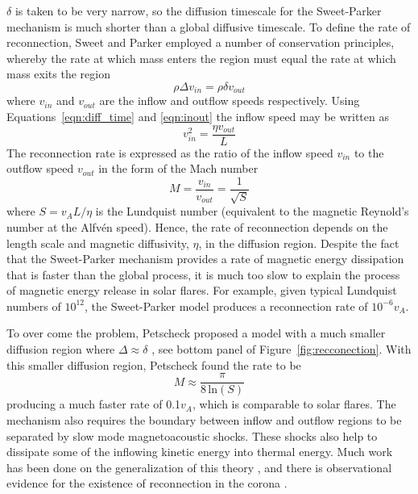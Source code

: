 $\delta$ is taken to be very narrow, so the diffusion timescale for the Sweet-Parker mechanism is much shorter than a global diffusive timescale. To define the rate of reconnection, Sweet and Parker employed a number of conservation principles, whereby the rate at which mass enters the region must equal the rate at which mass exits the region
\begin{equation}
\rho \Delta v_{in} = \rho \delta v_{out}
\label{eqn:inout}
\end{equation}
where $v_{in}$ and $v_{out}$ are the inflow and outflow speeds respectively. Using Equations~\ref{eqn:diff_time} and \ref{eqn:inout} the inflow speed may be written as
\begin{equation}
v_{in}^2 = \frac{\eta v_{out}}{L}
\end{equation}
The reconnection rate is expressed as the ratio of the inflow speed $v_{in}$ to the outflow speed $v_{out}$ in the form of the Mach number
\begin{equation}
M = \frac{v_{in}}{v_{out}} = \frac{1}{\sqrt{S}}
\end{equation}
where $S=v_AL/\eta$ is the Lundquist number (equivalent to the magnetic Reynold's number at the Alfv\'{e}n speed). Hence, the rate of reconnection depends on the length scale and magnetic diffusivity, $\eta$, in the diffusion region. Despite the fact that the Sweet-Parker mechanism provides a rate of magnetic energy dissipation that is faster than the global process, it is much too slow to explain the process of magnetic energy release in solar flares. For example, given typical Lundquist numbers of $10^{12}$, the Sweet-Parker model produces a reconnection rate of $10^{-6}v_A$.

To over come the problem, Petscheck proposed a model with a much smaller diffusion region where $\Delta\approx\delta$ \citep{petschek1964}, see bottom panel of Figure~\ref{fig:recconection}. With this smaller diffusion region, Petscheck found the rate to be \begin{equation}
M \approx \frac{\pi}{8\,\mathrm{ln}(S)}
\end{equation}
producing a much faster rate of 0.1$v_A$, which is comparable to solar flares. The mechanism also requires the boundary between inflow and outflow regions to be separated by slow mode magnetoacoustic shocks. These shocks also help to dissipate some of the inflowing kinetic energy into thermal energy. Much work has been done on the generalization of this theory \citep{priest1986, sonnerup1970}, and there is observational evidence for the existence of reconnection in the corona \citep{su2013}.

